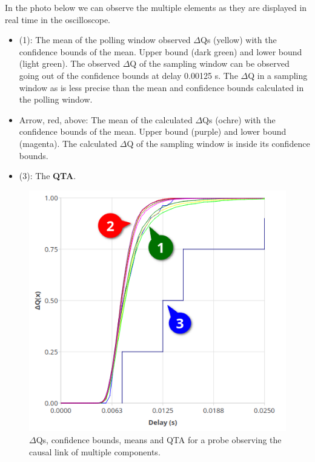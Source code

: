     In the photo below we can observe the multiple elements as they are displayed in real time in the oscilloscope.
    \begin{itemize}
        \item (1): The mean of the polling window observed $\Delta$Qs (yellow) with the confidence bounds of the mean. Upper bound (dark green) and lower bound (light green). The observed $\Delta$Q of the sampling window can be observed going out of the confidence bounds at delay 0.00125 s. The $\Delta$Q in a sampling window as is less precise than the mean and confidence bounds calculated in the polling window.
        \item Arrow, red, above: The mean of the calculated $\Delta$Qs (ochre) with the confidence bounds of the mean. Upper bound (purple) and lower bound (magenta). The calculated $\Delta$Q of the sampling window is inside its confidence bounds.
        \item (3): The \textbf{QTA}.
    \end{itemize}
     \begin{figure}[H]
        \begin{center}
            \includegraphics[scale = 0.7]{img/overload_2/fired_sampleb.png}
        \end{center}
         \caption{$\Delta$Qs, confidence bounds, means and QTA for a probe observing the causal link of multiple components.}
    \end{figure}
        

